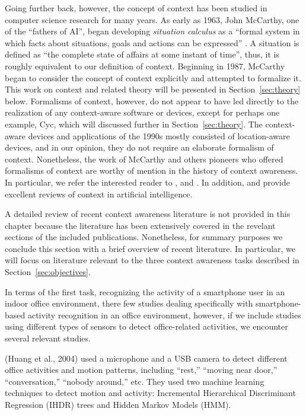 Going further back, however, the concept of context has been studied in computer science research for many years. As early as 1963, John McCarthy, one of the ``fathers of AI'', began developing \emph{situation calculus} as a ``formal system in which facts about situations, goals and actions can be expressed'' \cite{mccarthy1963programs}. A situation is defined as ``the complete state of affairs at some instant of time'', thus, it is roughly equivalent to our definition of context. Beginning in 1987, McCarthy began to consider the concept of context explicitly and attempted to formalize it. This work on context and related theory will be presented in Section~\ref{sec:theory} below. Formalisms of context, however, do not appear to have led directly to the realization of any context-aware software or devices, except for perhaps one example, Cyc, which will discussed further in Section~\ref{sec:theory}. The context-aware devices and applications of the 1990s mostly consisted of location-aware devices, and in our opinion, they do not require an elaborate formalism of context. Nonetheless, the work of McCarthy and others pioneers who offered formalisms of context are worthy of mention in the history of context awareness. In particular, we refer the interested reader to \cite{McCarthy1993} \cite{guha1991contexts} \cite{mccarthy1997formalizing} \cite{akman1996steps}, and \cite{buvac1993propositional}. In addition, \cite{brezillon1999context} and \cite{akman2002context} provide excellent reviews of context in artificial intelligence.

A detailed review of recent context awareness literature is not provided in this chapter because the literature has been extensively covered in the revelant sections of the included publications. Nonetheless, for summary purposes we conclude this section with a brief overview of recent literature. In particular, we will focus on literature relevant to the three context awareness tasks described in Section~\ref{sec:objectives}.

In terms of the first task, recognizing the activity of a smartphone user in an indoor office environment, there few studies dealing specifically with smartphone-based activity recognition in an office environment, however, if we include studies using different types of sensors to detect office-related activities, we encounter several relevant studies.

(Huang et al., 2004) %
used a microphone and a USB %
camera to detect different office activities and motion patterns, including ``rest,'' ``moving near door,'' ``conversation,'' ``nobody around,'' etc. They used two machine learning techniques to detect motion and activity: Incremental Hierarchical Discriminant Regression (IHDR) trees and Hidden Markov Models (HMM).

